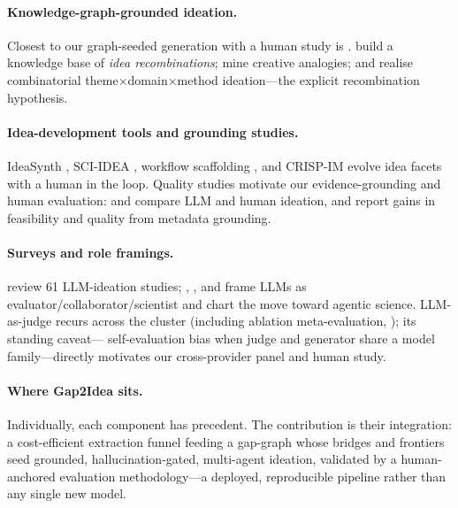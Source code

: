 \paragraph{Knowledge-graph-grounded ideation.} Closest to our graph-seeded
generation with a human study is \citet{generationhuman2024}. \citet{chimera2025}
build a knowledge base of \emph{idea recombinations}; \citet{cam2023} mine
creative analogies; and \citet{ramonllull} realise combinatorial
theme$\times$domain$\times$method ideation---the explicit recombination
hypothesis.

\paragraph{Idea-development tools and grounding studies.} IdeaSynth
\citep{ideasynth2025}, SCI-IDEA \citep{sciidea2025}, workflow scaffolding
\citep{scaffoldingflexibl2025}, and CRISP-IM \citep{adaptingcrisp2021} evolve idea
facets with a human in the loop. Quality studies motivate our evidence-grounding
and human evaluation: \citet{canchatgpt2024} and \citet{comparingideation2024}
compare LLM and human ideation, and \citet{improvingresearch2025} report gains in
feasibility and quality from metadata grounding.

\paragraph{Surveys and role framings.} \citet{reviewllm2025} review 61
LLM-ideation studies; \citet{evolvingrole}, \citet{ai4research2025}, and
\citet{aiscience2025} frame LLMs as evaluator/collaborator/scientist and chart the
move toward agentic science. LLM-as-judge recurs across the cluster (including
ablation meta-evaluation, \citealp{abgen2025}); its standing caveat---%
self-evaluation bias when judge and generator share a model family---directly
motivates our cross-provider panel and human study.

\paragraph{Where Gap2Idea sits.} Individually, each component has precedent. The
contribution is their integration: a cost-efficient extraction funnel feeding a
gap-graph whose bridges and frontiers seed grounded, hallucination-gated,
multi-agent ideation, validated by a human-anchored evaluation
methodology---a deployed, reproducible pipeline rather than any single new model.
